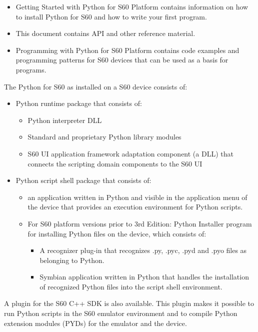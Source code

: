 \begin{itemize}
\item Getting Started with Python for S60 Platform \cite{PyS60Start} contains information on how to install Python for S60 and how to write your first program.
\item This document contains API and other reference material.
\item Programming with Python for S60 Platform \cite{PyS60Prog} contains code examples and programming patterns for S60 devices that can be used as a basis for programs.
\end{itemize}
The Python for S60 as installed on a S60 device consists of:
\begin{itemize}
  \item Python runtime package that consists of:
  \begin{itemize}
   \item Python interpreter DLL
   \item Standard and proprietary Python library modules
   \item S60 UI application framework adaptation component (a DLL) that connects the scripting domain components to the S60 UI
  \end{itemize}
  \item Python script shell package that consists of:
  \begin{itemize}
   \item an application written in Python and visible in the application menu of the device that provides an execution environment for Python scripts.
   \item For S60 platform versions prior to 3rd Edition: Python Installer program for installing Python files on the device, which consists of:
 \begin{itemize} 
  \item A recognizer plug-in that recognizes .py, .pyc, .pyd and .pyo files as belonging to Python.
  \item Symbian	application written in Python that handles the installation of recognized Python files into the script shell environment.
 \end{itemize}
 \end{itemize}
\end{itemize}

A plugin for the S60 C++ SDK is also available. This plugin makes it
possible to run Python scripts in the S60 emulator environment and to
compile Python extension modules (PYDs) for the emulator and the
device.


